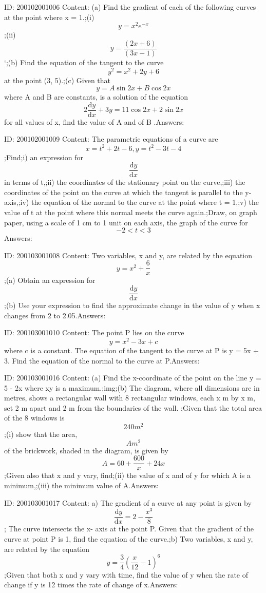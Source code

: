 \documentclass{article}
\begin{document}
ID: 200102001006
Content:
(a)	Find the gradient of each of the following curves at the point where x = 1.;(i) \[y=x^2e^{-x}\] ;(ii)	\[y=\frac{(2x+6)}{(3x-1)}\]`;(b)	Find the equation of the tangent to the curve \[y^2=x^2+2y+6\]  at the point (3, 5).;(c)	Given that \[y = A \sin 2x + B \cos 2x\] where A and B are constants, is a solution of the equation \[2 \frac{\mathrm{d} y}{\mathrm{d} x}+3y=11\cos 2x+2\sin 2x\] for all values of x, find the value of A and of B .Answers:

ID: 200102001009
Content:
The parametric equations of a curve are \[x=t^2+2t-6, y=t^2-3t-4\];Find;i) an expression for \[\frac{\mathrm{d} y}{\mathrm{d} x}\]in terms of t,;ii) the coordinates of the stationary point on the curve,;iii) the coordinates of the point on the curve at which the tangent is parallel to the y-axis,;iv) the equation of the normal to the curve at the point where t = 1,;v) the value of t at the point where this normal meets the curve again.;Draw, on graph paper, using a scale of 1 cm to 1 unit on each axis, the graph of the curve for \[- 2<  t< 3\]Answers:

ID: 200103001008
Content:
Two variables, x and y, are related by the equation \[y=x^2+\frac{6}{x}\];(a)	Obtain an expression for \[\frac{\mathrm{d} y}{\mathrm{d} x}\];(b)	Use your expression to find the approximate change in the value of y when x changes from 2 to 2.05.Answers:

ID: 200103001010
Content:
The point P lies on the curve \[y=x^2-3x+c\] where c is a constant. The equation of the tangent to the curve at P is y = 5x + 3. Find the equation of the normal to the curve at P.Answers:

ID: 200103001016
Content:
(a)	Find the x-coordinate of the point on the line y = 5 - 2x where xy is a maximum.;img;(b)	The diagram, where all dimensions are in metres, shows a rectangular wall with 8 rectangular windows, each x m by x m, set 2 m apart and 2 m from the boundaries of the wall. ;Given that the total area of the 8 windows is \[240m^2\];(i)	show that the area, \[Am^2\] of the brickwork, shaded in the diagram, is given by \[A=60+\frac{600}{x}+24x\] ;Given also that x and y vary, find;(ii)	the value of x and of y for which A is a minimum,;(iii)	the minimum value of A.Answers:

ID: 200103001017
Content:
a) The gradient of a curve at any point is given by \[\frac{\mathrm{d} y}{\mathrm{d} x}=2-\frac{x^{3}}{8}\];  The curve intersects the x- axis at the point P. Given that the gradient of the curve at point P is 1, find the equation of the curve.;b) Two variables, x and y, are related by the equation \[y=\frac{3}{4}(\frac{x}{12}-1)^6\];Given that both x and y vary with time, find the value of y when the rate of change if y is 12 times the rate of change of x.Answers:
\end{document}
